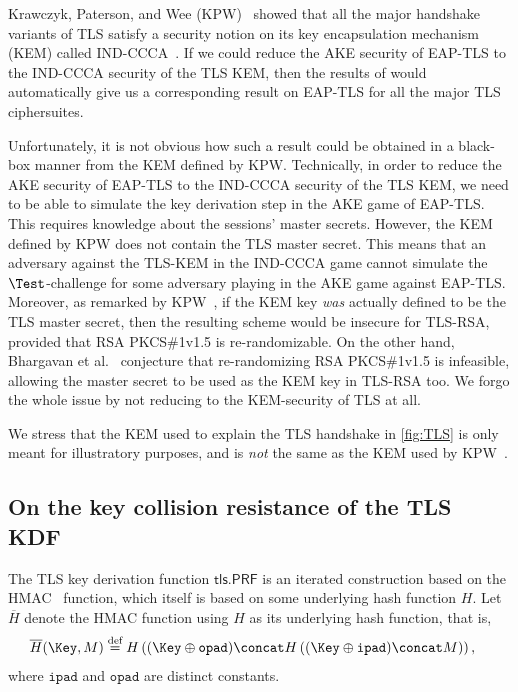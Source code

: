 Krawczyk, Paterson, and Wee (KPW)~\cite{C:KraPatWee13} showed that all the major handshake variants of TLS satisfy a security notion on its key encapsulation mechanism (KEM) called IND-CCCA~\cite{C:HofKil07}. 
If we could reduce the AKE security of EAP-TLS to the IND-CCCA security of the TLS KEM,
then the results of \cite{C:KraPatWee13} would automatically give us a corresponding result on EAP-TLS for all the major TLS ciphersuites.

Unfortunately,
it is not obvious how such a result could be obtained in a black-box manner from the KEM defined by KPW.
Technically,
in order to reduce the AKE security of EAP-TLS to the IND-CCCA security of the TLS KEM,
we need to be able to simulate the key derivation step in the AKE game of EAP-TLS.
This requires knowledge about the sessions' master secrets.
However,
the KEM defined by KPW does not contain the TLS master secret. 
This means that an adversary against the TLS-KEM in the IND-CCCA game
cannot simulate the $\Test$-challenge for some adversary playing in the AKE game against EAP-TLS. 
Moreover,
as remarked by KPW~\cite[Remark~4]{C:KraPatWee13},
if the KEM key \emph{was} actually defined to be the TLS master secret,
then the resulting scheme would be insecure for TLS-RSA,
provided that RSA PKCS\#1v1.5 is re-randomizable.
On the other hand, 
Bhargavan et al.~\cite{C:BFKPSZ14}
conjecture that re-randomizing RSA PKCS\#1v1.5 is infeasible, 
allowing the master secret to be used as the KEM key in TLS-RSA too.
We forgo the whole issue by not reducing to the KEM-security of TLS at all. 


We stress that the KEM used to explain the TLS handshake in \cref{fig:TLS} is only meant for illustratory purposes,
and is \emph{not} the same as the KEM used by KPW~\cite{C:KraPatWee13}.


\subsection{On the key collision resistance of the TLS KDF}\label{sec:tls.PRF_collision_resistance}


\newcommand{\HMAC}{\overline{H}}
\newcommand{\padI}{\mathtt{ipad}}
\newcommand{\padO}{\mathtt{opad}}


The TLS key derivation function $\mathsf{tls.PRF}$ is an iterated construction based on the  HMAC~\cite{IETF:RFC2104:HMAC} function,
which itself is based on some underlying  hash function $H$. 
Let $\HMAC$ denote the HMAC function using $H$ as its underlying hash function,
that is,
\begin{align}
	\HMAC(\Key, M) &\overset{\text{def}}{=} H \left( (\Key \oplus \padO) \concat H\left( (\Key \oplus \padI) \concat M \right) \right) \label{eq:HMAC:def} , %
\end{align}
where $\padI$ and $\padO$ are distinct constants.

